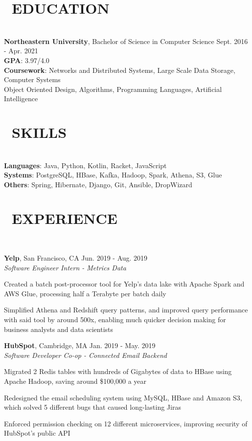 \documentclass[11pt]{res}
\newcommand{\sectionunderline}{\vspace{-3mm}\hrulefill\\}
\newcommand{\listingtab}{\tabto{2.8cm}}
\newcommand{\newsect}[1]{\section{\Large \bf #1}}
\newcommand{\email}[1]{\faEnvelope\hspace{1mm} \href{mailto:#1}{#1}}
\newcommand{\phone}[1]{\faMobilePhone\hspace{1mm} #1}
\newcommand{\github}[1]{\faGithubAlt\hspace{1mm} \href{https://github.com/#1}{#1}}
\newcommand{\linkedin}[1]{\faLinkedinSquare\hspace{1mm} \href{https://linkedin.com/in/#1}{#1}}
\begin{document}
\address{
  \large\phone{(802) 503-5089}\:
  \large{$\bullet$}
  \large\email{derekpham67@gmail.com}\:
  \large{$\bullet$}
  \large\github{derekpham}\:
  \large{$\bullet$}
  \large\linkedin{derek-pham97}\\
}

\begin{resume}
  \newsect{\faGraduationCap\ EDUCATION}{
    \sectionunderline{
      {\bf Northeastern University}, Bachelor of Science in Computer Science \hfill Sept. 2016 - Apr. 2021\\
      {\bf GPA}: \listingtab 3.97/4.0\\
      {\bf Coursework}: \listingtab Networks and Distributed Systems, Large Scale Data Storage, Computer Systems\\
      \listingtab Object Oriented Design, Algorithms, Programming Languages, Artificial Intelligence
    }
  }

  \newsect{\faCogs\ SKILLS}{
    \sectionunderline{
      {\bf Languages}: \listingtab Java, Python, Kotlin, Racket, JavaScript\\
      {\bf Systems}: \listingtab PostgreSQL, HBase, Kafka, Hadoop, Spark, Athena, S3, Glue\\
      {\bf Others}: \listingtab Spring, Hibernate, Django, Git, Ansible, DropWizard
    }
  }

  \newsect{\faUsers\ EXPERIENCE}{
    \sectionunderline{
      {\bf Yelp}, San Francisco, CA \hfill Jun. 2019 - Aug. 2019\\
      {\it Software Engineer Intern - Metrics Data}
      \begin{itemize}
        {\item Created a batch post-processor tool for Yelp's data lake with Apache Spark and AWS Glue, processing half a Terabyte per batch daily}
        {\item Simplified Athena and Redshift query patterns, and improved query performance with said tool by around 500x, enabling much quicker decision making for business analysts and data scientists}
      \end{itemize}

      {\bf HubSpot}, Cambridge, MA \hfill Jan. 2019 - May. 2019\\
      {\it Software Developer Co-op - Connected Email Backend}
      \begin{itemize}
        {\item Migrated 2 Redis tables with hundreds of Gigabytes of data to HBase using Apache Hadoop, saving around \$100,000 a year}
        {\item Redesigned the email scheduling system using MySQL, HBase and Amazon S3, which solved 5 different bugs that caused long-lasting Jiras}
        {\item Enforced permission checking on 12 different microservices, improving security of HubSpot's public API}
      \end{itemize}

}}
\end{resume}
\end{document}
